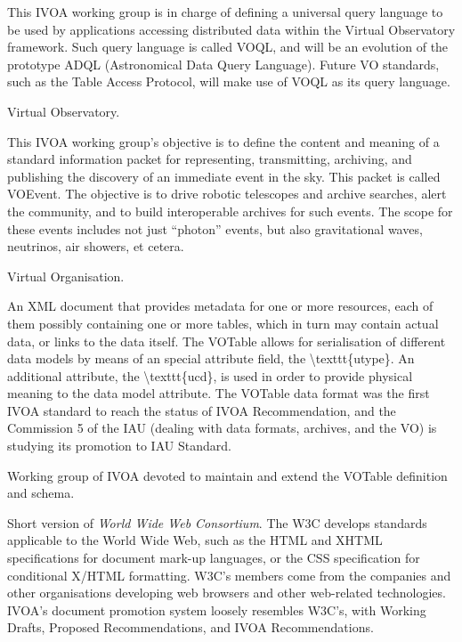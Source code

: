 {
    	This \gls{IVOA} working group is in charge of defining a
        universal query language to be used by applications accessing
        distributed data within the \gls{Virtual Observatory}
        framework. Such query language is called VOQL, and will be an
        evolution of the prototype ADQL (Astronomical Data Query
        Language). Future VO standards, such as the Table Access
        Protocol, will make use of VOQL as its query language.
}


{    	\gls{Virtual Observatory}.
}

{
    	This \gls{IVOA} working group's objective is to define the
        content and meaning of a standard information packet for
        representing, transmitting, archiving, and publishing the
        discovery of an immediate event in the sky. This packet is
        called VOEvent. The objective is to drive robotic telescopes
        and archive searches, alert the community, and to build
        interoperable archives for such events. The scope for these
        events includes not just ``photon'' events, but also
        gravitational waves, neutrinos, air showers, et cetera.
}

{    	\gls{Virtual Organisation}.
}

{
    	An \gls{XML} document that provides \gls{metadata} for one or
        more resources, each of them possibly containing one or more
        tables, which in turn may contain actual data, or links to the
        data itself. The VOTable allows for serialisation of different
        data models by means of an special attribute field, the
        \gls{\texttt{utype}}. An additional attribute, the
        \gls{\texttt{ucd}}, is used in order to provide physical
        meaning to the data model attribute. The VOTable data format
        was the first \gls{IVOA} standard to reach the status of
        \gls{IVOA Recommendation}, and the Commission 5 of the
        \gls{IAU} (dealing with data formats, archives, and the VO) is
        studying its promotion to IAU Standard.
}

{
    	Working group of \gls{IVOA} devoted to maintain and extend the
        \gls{VOTable} definition and schema.
}

{
    	Short version of \emph{World Wide Web Consortium}. The W3C
        develops standards applicable to the \gls{World Wide Web}, such
        as the \gls{HTML} and \gls{XHTML} specifications for document
        mark-up languages, or the \gls{CSS} specification for
        conditional X/HTML formatting. W3C's members come from the
        companies and other organisations developing web browsers and
        other web-related technologies. \gls{IVOA}'s document promotion
        system loosely resembles W3C's, with Working Drafts, Proposed
        Recommendations, and IVOA Recommendations.
}

